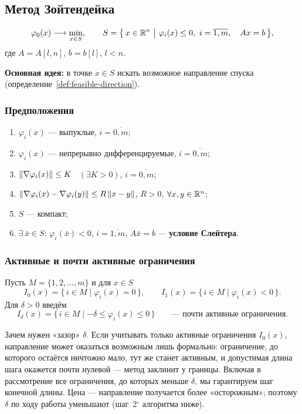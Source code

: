 \subsection{Метод Зойтендейка}
\label{subsec:zoutendijk}

\[
  \varphi_0(x) \longrightarrow \min_{x \in S} ,
  \qquad
  S = \big\{\, x \in \mathbb{R}^n \ \big|\ \varphi_i(x) \le 0,\ i = \overline{1,m},
      \quad Ax = b \,\big\} ,
\]
где $A = A[l, n]$, $b = b[l]$, $l < n$.

\medskip
\noindent\textbf{Основная идея:} в точке $x \in S$ искать возможное направление
спуска (определение~\ref{def:feasible-direction}).

\subsubsection*{Предположения}

\begin{enumerate}[label=\arabic*),left=0pt]
  \item $\varphi_i(x)$ — выпуклые, $i = \overline{0,m}$;
  \item $\varphi_i(x)$ — непрерывно дифференцируемые, $i = \overline{0,m}$;
  \item $\left\lVert \nabla \varphi_i(x) \right\rVert \le K$ \ $(\exists K > 0)$,
        $i = \overline{0,m}$;
  \item $\left\lVert \nabla\varphi_i(x) - \nabla\varphi_i(y) \right\rVert \le R\left\lVert x - y \right\rVert$,
        $R > 0$, $\forall x, y \in \mathbb{R}^n$;
  \item $S$ — компакт;
  \item $\exists\, \bar{x} \in S$: $\varphi_i(\bar{x}) < 0$, $i = \overline{1,m}$,
        $A\bar{x} = b$ — \textbf{условие Слейтера}.
\end{enumerate}

\subsubsection*{Активные и почти активные ограничения}

Пусть $M = \{1, 2, \dots, m\}$ и для $x \in S$
\[
  I_0(x) = \{\, i \in M \mid \varphi_i(x) = 0 \,\} ,
  \qquad
  I_1(x) = \{\, i \in M \mid \varphi_i(x) < 0 \,\} .
\]
Для $\delta > 0$ введём
\[
  I_\delta(x) = \{\, i \in M \mid -\delta \le \varphi_i(x) \le 0 \,\}
  \qquad \text{— почти активные ограничения.}
\]

\begin{idea}
Зачем нужен «зазор» $\delta$. Если учитывать только активные ограничения
$I_0(x)$, направление может оказаться возможным лишь формально: ограничение,
до которого остаётся ничтожно мало, тут же станет активным, и допустимая длина
шага окажется почти нулевой — метод заклинит у границы. Включая в рассмотрение
все ограничения, до которых меньше $\delta$, мы гарантируем шаг конечной длины.
Цена — направление получается более «осторожным»; поэтому $\delta$ по ходу
работы уменьшают (шаг~2$^\circ$ алгоритма ниже).
\end{idea}


